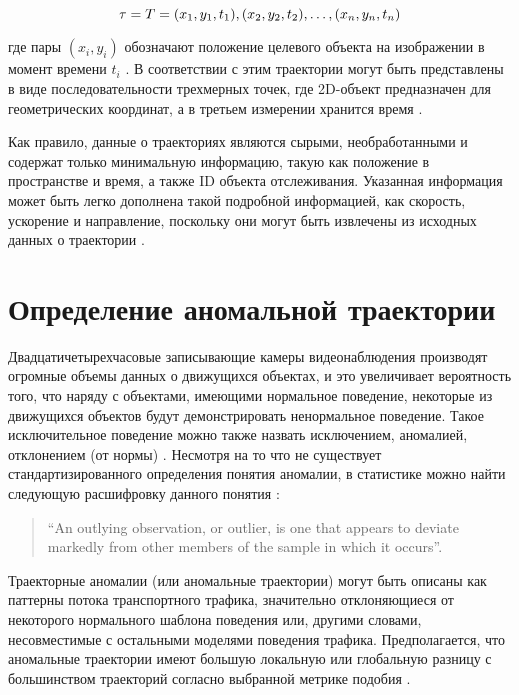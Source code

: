 \begin{equation}
	\tau = T = {(x_1, y_1, t_1), (x_2, y_2, t_2), \ldots, (x_n, y_n, t_n)}\\[3pt]
\end{equation}

где пары $(x_i,y_i)$ обозначают положение целевого объекта на изображении в момент времени $t_i$ \cite{article:5_survey_tbsa}. В соответствии с этим траектории могут быть представлены в виде последовательности трехмерных точек, где 2D-объект предназначен для геометрических координат, а в третьем измерении хранится время \cite{article:25_dhr_mvt_eesd}.

Как правило, данные о траекториях являются сырыми, необработанными и содержат только минимальную информацию, такую как положение в пространстве и время, а также ID объекта отслеживания. Указанная информация может быть легко дополнена такой подробной информацией, как скорость, ускорение и направление, поскольку они могут быть извлечены из исходных данных о траектории \cite{article:12_dssto_mot}.

\section{Определение аномальной траектории}

Двадцатичетырехчасовые записывающие камеры видеонаблюдения производят огромные объемы данных о движущихся объектах, и это увеличивает вероятность того, что наряду с объектами, имеющими нормальное поведение, некоторые из движущихся объектов будут демонстрировать ненормальное поведение. Такое исключительное поведение можно также назвать исключением, аномалией, отклонением (от нормы) \cite{article:11_eod_hdd}\cite{article:15_survey_ad}. Несмотря на то что не существует стандартизированного определения понятия аномалии, в статистике можно найти следующую расшифровку данного понятия \cite{article:13_pdoos}:

\begin{quote}
	``An outlying observation, or outlier, is one that appears to deviate markedly from other members of the sample in which it occurs''.
\end{quote}

Траекторные аномалии (или аномальные траектории) могут быть описаны как паттерны потока транспортного трафика, значительно отклоняющиеся от некоторого нормального шаблона поведения или, другими словами, несовместимые с остальными моделями поведения трафика. Предполагается, что аномальные траектории имеют большую локальную или глобальную разницу с большинством траекторий согласно выбранной метрике подобия \cite{article:over_tod}.

